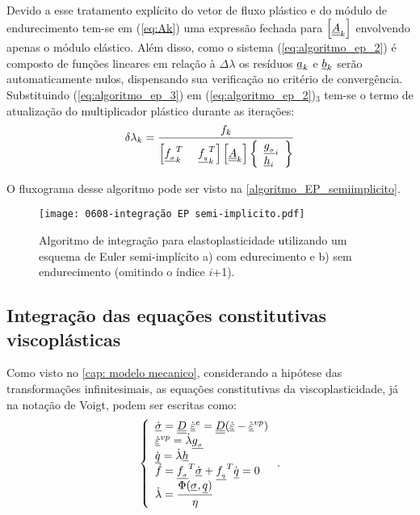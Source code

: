 Devido a esse tratamento explícito do vetor de fluxo plástico e do módulo de endurecimento tem-se em (\ref{eq:Ak}) uma expressão fechada para $\left[\underline{\underline A}_k \right]$ envolvendo apenas o módulo elástico. Além disso, como o sistema (\ref{eq:algoritmo_ep_2}) é composto de funções lineares em relação à $\Delta \lambda$ os resíduos $\underline{a}_k$ e $\underline{b}_k$ serão automaticamente nulos, dispensando sua verificação no critério de convergência. Substituindo (\ref{eq:algoritmo_ep_3}) em (\ref{eq:algoritmo_ep_2})$_3$ tem-se o termo de atualização do multiplicador plástico durante as iterações:
\begin{equation}
	\label{eq:deltalambdak}
	\delta \lambda_k = \dfrac{f_k}{\left[\underline{f_{_\sigma}}_k^T~~~~\underline{f_{_q}}_k^T\right]\left[\underline{\underline A}_k \right]\left\{ 
	\begin{array}{lcl}
			\underline{g_{_\sigma}}_i \\ 
			\underline h_i
	\end{array}\right\}}
\end{equation}

O fluxograma desse algoritmo pode ser visto na \autoref{algoritmo_EP_semiimplicito}.

\begin{figure}[H]
	\begin{center}
		\texttt{[image: 0608-integração EP semi-implicito.pdf]}
	\end{center}
	\caption{\label{algoritmo_EP_semiimplicito}Algoritmo de integração para elastoplasticidade utilizando um esquema de Euler semi-implícito a) com edurecimento e b) sem endurecimento (omitindo o índice $i$+1).}
\end{figure}

\subsection{Integração das equações constitutivas viscoplásticas}

Como visto no \autoref{cap: modelo mecanico}, considerando a hipótese das transformações infinitesimais, as equações constitutivas da viscoplasticidade, já na notação de Voigt, podem ser escritas como:
\begin{equation}
	\label{eq:constitutiva_vp}
	\left\{
	\begin{array}{lcl}
		\dot {\underline \sigma} = \underline{\underline D}~\dot {\underline{\varepsilon}}^e = \underline{\underline D}(\dot {\underline{\varepsilon}} - \dot {\underline{\varepsilon}}^{vp}) \\
		\dot {\underline{\varepsilon}}^{vp} = \dot \lambda \underline{g_{_\sigma}} \\
		\dot {\underline q} = \dot \lambda \underline h \\
		\dot f = \underline{f_{_\sigma}}^T \dot {\underline \sigma} + \underline{f_{_q}}^T \dot {\underline q} = 0 \\
		\dot \lambda =  \dfrac{\Phi(\underline \sigma, \underline q)}{\eta}	
	\end{array}
	\right..
\end{equation}

